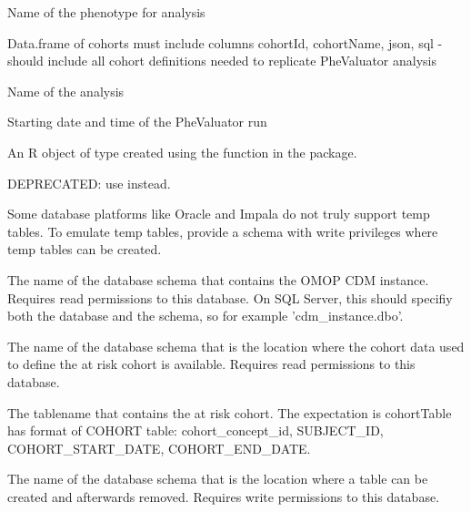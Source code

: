 \documentclass[a4paper]{book}
\begin{document}
\begin{Arguments}
\begin{ldescription}
\item[\code{phenotype}] Name of the phenotype for analysis

\item[\code{cohortDefinitionSet}] Data.frame of cohorts must include columns cohortId, cohortName, json, sql - should include all
cohort definitions needed to replicate PheValuator analysis

\item[\code{analysisName}] Name of the analysis

\item[\code{runDateTime}] Starting date and time of the PheValuator run

\item[\code{connectionDetails}] An R object of type  created using the
function  in the
 package.

\item[\code{oracleTempSchema}] DEPRECATED: use  instead.

\item[\code{tempEmulationSchema}] Some database platforms like Oracle and Impala do not truly support temp tables. To
emulate temp tables, provide a schema with write privileges where temp tables
can be created.

\item[\code{cdmDatabaseSchema}] The name of the database schema that contains the OMOP CDM
instance. Requires read permissions to this database. On SQL
Server, this should specifiy both the database and the
schema, so for example 'cdm\_instance.dbo'.

\item[\code{cohortDatabaseSchema}] The name of the database schema that is the location where
the cohort data used to define the at risk cohort is
available. Requires read permissions to this database.

\item[\code{cohortTable}] The tablename that contains the at risk cohort. The
expectation is cohortTable has format of COHORT table:
cohort\_concept\_id, SUBJECT\_ID, COHORT\_START\_DATE,
COHORT\_END\_DATE.

\item[\code{workDatabaseSchema}] The name of the database schema that is the location where
a table can be created and afterwards removed.
Requires write permissions to this database.


\end{ldescription}
\end{Arguments}
\end{document}
